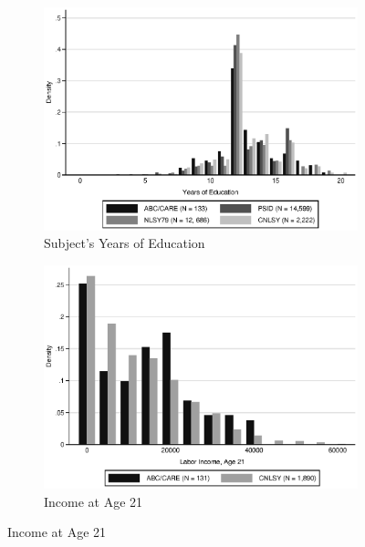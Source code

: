 \begin{figure}[H]
		\ContinuedFloat
	\begin{subfigure}[h]{0.8\textwidth}
	\centering
	\caption{Subject's Years of Education} \label{fig:support_educ}
	\includegraphics[width=\textwidth]{AppOutput/Methodology/support_educ.eps}
	\end{subfigure}
	
	\begin{subfigure}[h]{0.8\textwidth}
	\centering
	\caption{Income at Age 21} \label{fig:support_inc21}
	\includegraphics[width=\textwidth]{AppOutput/Methodology/support_inc21.eps}
	\end{subfigure}
	
\end{figure}

